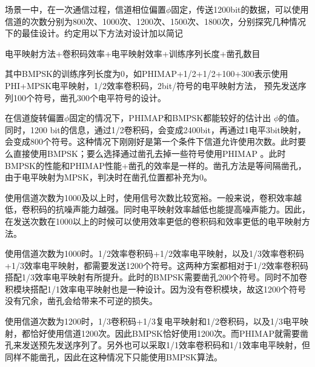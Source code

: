 场景一中，在一次通信过程，信道相位偏置$\phi$固定，传送1200bit的数据，可以使用信道的次数分别为800次、1000次、1200次、1500次、1800次，分别探究几种情况下的最佳设计。约定用以下方法对设计加以简记
\begin{center}
电平映射方法+卷积码效率+电平映射效率+训练序列长度+凿孔数目
\end{center}

其中BMPSK的训练序列长度为0，如PHIMAP+1/2+1/2+100+300表示使用PHI+MPSK电平映射，1/2效率卷积码，2bit/符号的电平映射方法， 预先发送序列100个符号，凿孔300个电平符号的设计。

在信道旋转偏置$\phi$固定的情况下，PHIMAP和BMPSK都能较好的估计出 $\phi$的值。同时，1200 bit的信息，通过1/2卷积码，会变成2400bit，再通过1电平3bit映射，会变成800个符号。这种情况下刚刚好是第一个条件下信道允许使用次数。此时要么直接使用BMPSK；要么选择通过凿孔去掉一些符号使用PHIMAP 。此时BMPSK的性能和PHIMAP性能+凿孔的效率是一样的。凿孔方法是等间隔凿孔，由于电平映射为MPSK，判决时在凿孔位置都补充为0。

使用信道次数为1000及以上时，使用信号次数比较宽裕。一般来说，卷积效率越低，卷积码的抗噪声能力越强。同时电平映射效率越低也能提高噪声能力。因此，在发送次数在1000以上的时候可以使用效率更低的卷积码和效率更低的电平映射方法。

使用信道次数为1000时。1/2效率卷积码+1/2效率电平映射，以及1/3效率卷积码+1/3效率电平映射，都需要发送1200个符号。这两种方案都相对于1/2效率卷积码搭配1/3效率电平映射有所提升。此时的BMPSK需要凿孔200个符号。同时不加卷积模块搭配1/1效率电平映射也是一种设计。因为没有卷积模块，故这1200个符号没有冗余，凿孔会给带来不可逆的损失。

使用信道次数为1200时，1/3卷积码+1/3复电平映射和1/2卷积码，以及1/3电平映射，都恰好使用信道1200次。因此BMPSK恰好使用1200次。而PHIMAP就需要凿孔来发送预先发送序列了。另外也可以采取1/1效率卷积码和1/1效率电平映射，但同样不能凿孔，因此在这种情况下只能使用BMPSK算法。

